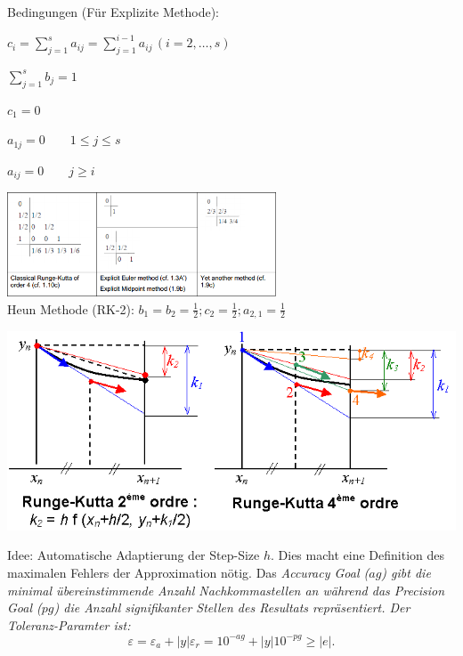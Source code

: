       \begin{minipage}{9cm}
        Bedingungen (Für Explizite Methode):
        \begin{liste}
          \item $c_i = \sum\limits_{j=1}^s a_{ij} = \sum\limits_{j=1}^{i-1} a_{ij}\,(i=2,\ldots,s)$
          \item $\sum\limits_{j=1}^s b_j = 1$
          \item $c_1=0$
          \item $a_{1j} = 0 \qquad 1\leq j\leq s $
          \item $a_{ij} = 0 \qquad j\geq i$
        \end{liste}
        \includegraphics[width=8cm]{./bilder/ode_rungekutta_butcher_examples.png}\\
        Heun Methode (RK-2): $b_1 = b_2 = \frac{1}{2}; c_2=\frac{1}{2}; a_{2,1}=\frac{1}{2}$
      \end{minipage}

      \begin{center}
          \includegraphics[width=0.6\linewidth]{bilder/rungekutta.png}
      \end{center}

\newpage
      Idee: Automatische Adaptierung der Step-Size $h$. Dies macht eine Definition des maximalen
      Fehlers der Approximation nötig. Das \em Accuracy Goal \em ($ag$)
      gibt die minimal übereinstimmende Anzahl Nachkommastellen an während
      das \em Precision Goal \em ($pg$) die Anzahl signifikanter Stellen des Resultats repräsentiert.
      Der Toleranz-Paramter ist:
      $$\varepsilon = \varepsilon_a+ |y|\varepsilon_r=10^{-ag} + |y| 10^{-pg} \geq |e|.$$

